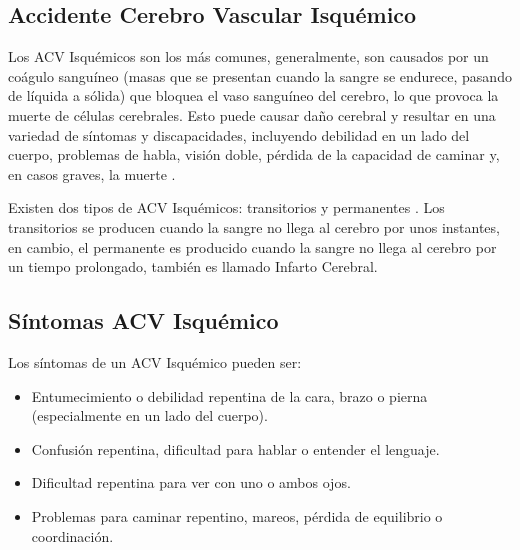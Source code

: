 \doublespacing
\subsection{Accidente Cerebro Vascular Isquémico}
\par Los ACV Isquémicos son los más comunes, generalmente, son causados por un coágulo sanguíneo (masas que se presentan cuando la sangre se endurece, pasando de líquida a sólida) que bloquea el vaso sanguíneo del cerebro, lo que provoca la muerte de células cerebrales. Esto puede causar daño cerebral y resultar en una variedad de síntomas y discapacidades, incluyendo debilidad en un lado del cuerpo, problemas de habla, visión doble, pérdida de la capacidad de caminar y, en casos graves, la muerte \cite{Adams1993}.\\
\par Existen dos tipos de ACV Isquémicos: transitorios y permanentes \cite{Garcia2019}. Los transitorios se producen cuando la sangre no llega al cerebro por unos instantes, en cambio, el permanente es producido cuando la sangre no llega al cerebro por un tiempo prolongado, también es llamado Infarto Cerebral. \\

\doublespacing
\subsection{Síntomas ACV Isquémico}
\par Los síntomas de un ACV Isquémico pueden ser:
	\begin{itemize}
		\item Entumecimiento o debilidad repentina de la cara, brazo o pierna (especialmente en un lado del cuerpo).
		\item Confusión repentina, dificultad para hablar o entender el lenguaje.
		\item Dificultad repentina para ver con uno o ambos ojos.
		\item Problemas para caminar repentino, mareos, pérdida de equilibrio o coordinación.\\
	\end{itemize}
	
\doublespacing
